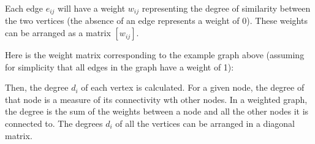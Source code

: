 \documentclass[11pt]{article}
\begin{document}
Each edge $e_{ij}$ will have a weight $w_{ij}$ representing the degree of similarity between the two vertices (the absence of an edge represents a weight of 0).  These weights can be arranged as a matrix $[w_{ij}]$.

Here is the weight matrix corresponding to the example graph above (assuming for simplicity that all edges in the graph have a weight of 1):

Then, the degree $d_i$ of each vertex is calculated.  For a given node, the degree of that node is a measure of its connectivity wth other nodes.  In a weighted graph, the degree is the sum of the weights between a node and all the other nodes it is connected to.  The degrees $d_i$ of all the vertices can be arranged in a diagonal matrix.

%
%
\end{document}
